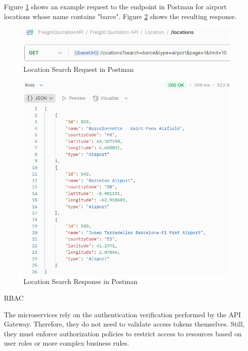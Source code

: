 \documentclass[12pt, reqno]{amsbook}
\makeatletter
\def\subsection{\@startsection{subsection}{2}%
      \z@{.5\linespacing\@plus.7\linespacing}{.25\linespacing}%
      {\normalfont\bfseries\flushleft}}
\theoremstyle{definition}
\theoremstyle{definition}
\numberwithin{section}{chapter}
\numberwithin{table}{chapter}
\numberwithin{figure}{chapter}
\makeatother
\begin{document}
Figure \ref{Figure:LocationSearchRequestPostman} shows an example request to the endpoint in Postman for airport locations whose name contains "barce". Figure \ref{Figure:LocationSearchResponsePostman} shows the resulting response.

\begin{figure}[H]
  \centering
  \includegraphics[width=0.9\linewidth]{images/LocationSearchRequestPostman.png}
  \caption{\label{Figure:LocationSearchRequestPostman}Location Search Request in Postman}
\end{figure}

\begin{figure}[H]
  \centering
  \includegraphics[width=0.8\linewidth]{images/LocationSearchResponsePostman.png}
  \caption{\label{Figure:LocationSearchResponsePostman}Location Search Response in Postman}
\end{figure}

\subsection{\texorpdfstring{\ac{RBAC}}{RBAC}}
\label{Subsection:RBAC}

The microservices rely on the authentication verification performed by the \ac{API} Gateway. Therefore, they do not need to validate access tokens themselves. Still, they must enforce authorization policies to restrict access to resources based on user roles or more complex business rules.
\end{document}
